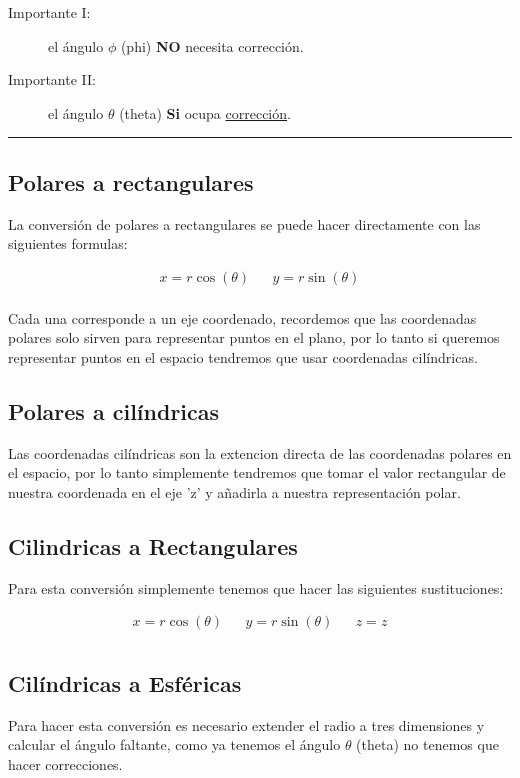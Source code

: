 \documentclass{article}
\begin{document}
\begin{description}
\item[{Importante I:}] el ángulo \(\phi\) (phi) \textbf{NO} necesita corrección.
\item[{Importante II:}] el ángulo \(\theta\) (theta) \textbf{Si} ocupa \hyperref[tab:org7551dd1]{corrección}.
\end{description}

\noindent\rule{\textwidth}{0.5pt}

\subsection{Polares a rectangulares}
\label{sec:orgb7ce591}
La conversión de polares a rectangulares se puede hacer directamente con las siguientes formulas: 

\[\begin{aligned}
 x = r \cos(\theta) && y = r \sin(\theta) \\
\end{aligned}\] 

Cada una corresponde a un eje coordenado, recordemos que las coordenadas polares solo sirven para representar puntos en el plano, por lo tanto si queremos representar puntos en el espacio tendremos que usar coordenadas cilíndricas.

\subsection{Polares a cilíndricas}
\label{sec:orge38f257}
Las coordenadas cilíndricas son la extencion directa de las coordenadas polares en el espacio, por lo tanto simplemente tendremos que tomar el valor rectangular de nuestra coordenada en el eje 'z' y añadirla a nuestra representación polar.

\subsection{Cilindricas a Rectangulares}
\label{sec:org3ecc721}
Para esta conversión simplemente tenemos que hacer las siguientes sustituciones:

\[\begin{aligned}
 x = r \cos(\theta) && y = r \sin(\theta) && z = z \\
\end{aligned}\] 

\subsection{Cilíndricas a Esféricas}
\label{sec:org88feb7c}
Para hacer esta conversión es necesario extender el radio a tres dimensiones y calcular el ángulo faltante, como ya tenemos el ángulo \(\theta\) (theta) no tenemos que hacer correcciones.
\end{document}
